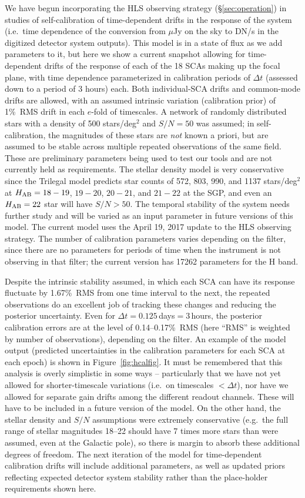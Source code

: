 We have begun incorporating the HLS observing strategy (\S\ref{sec:operation}) in studies of self-calibration of time-dependent drifts in the response of the system (i.e.\ time dependence of the conversion from $\mu$Jy on the sky to DN/s in the digitized detector system outputs). This model is in a state of flux as we add parameters to it, but here we show a current snapshot allowing for time-dependent drifts of the response of each of the 18 SCAs making up the focal plane, with time dependence parameterized in calibration periods of $\Delta t$ (assessed down to a period of 3 hours) each. Both individual-SCA drifts and common-mode drifts are allowed, with an assumed intrinsic variation (calibration prior) of 1\%\ RMS drift in each $e$-fold of timescales. A network of randomly distributed stars with a density of 500 stars/deg$^2$ and $S/N=50$ was assumed; in self-calibration, the magnitudes of these stars are {\em not} known a priori, but are assumed to be stable across multiple repeated observations of the same field. These are preliminary parameters being used to test our tools and are not currently held as requirements. The stellar density model is very conservative since the Trilegal model predicts star counts of 572, 803, 990, and 1137 stars/deg$^2$ at $H_{\rm AB}=18-19$, $19-20$, $20-21$, and $21-22$ at the SGP, and even an $H_{\rm AB}=22$ star will have $S/N>50$. The temporal stability of the system needs further study and will be varied as an input parameter in future versions of this model. The current model uses the April 19, 2017 update to the HLS observing strategy. The number of calibration parameters varies depending on the filter, since there are no parameters for periods of time when the instrument is not observing in that filter; the current version has 17262 parameters for the H band.

Despite the intrinsic stability assumed, in which each SCA can have its response fluctuate by 1.67\%\ RMS from one time interval to the next, the repeated observations do an excellent job of tracking these changes and reducing the posterior uncertainty. Even for $\Delta t = 0.125\,$days$=3\,$hours, the posterior calibration errors are at the level of 0.14--0.17\%\ RMS (here ``RMS'' is weighted by number of observations), depending on the filter.  An example of the model output (predicted uncertainties in the calibration parameters for each SCA at each epoch) is shown in Figure~\ref{fig:hcalfig}. It must be remembered that this analysis is overly simplistic in some ways -- particularly that we have not yet allowed for shorter-timescale variations (i.e.\ on timescales $<\Delta t$), nor have we allowed for separate gain drifts among the different readout channels. These will have to be included in a future version of the model. On the other hand, the stellar density and $S/N$ assumptions were extremely conservative (e.g.\ the full range of stellar magnitudes 18--22 should have 7 times more stars than were assumed, even at the Galactic pole), so there is margin to absorb these additional degrees of freedom. The next iteration of the model for time-dependent calibration drifts will include additional parameters, as well as updated priors reflecting expected detector system stability rather than the place-holder requirements shown here.

